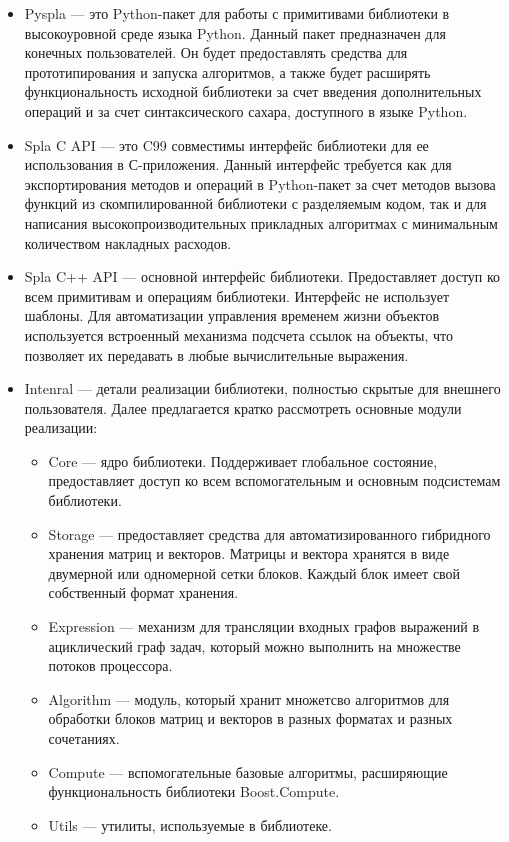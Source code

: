 \begin{itemize}
    \item Pyspla --- это Python-пакет для работы с примитивами библиотеки в высокоуровной среде языка Python. Данный пакет предназначен для конечных пользователей. Он будет предоставлять средства для прототипирования и запуска алгоритмов, а также будет расширять функциональность исходной библиотеки за счет введения дополнительных операций и за счет синтаксического сахара, доступного в языке Python.
    
    \item Spla C API --- это C99 совместимы интерфейс библиотеки для ее использования в С-приложения. Данный интерфейс требуется как для экспортирования методов и операций в Python-пакет за счет методов вызова функций из скомпилированной библиотеки с разделяемым кодом, так и для написания высокопроизводительных прикладных алгоритмах с минимальным количеством накладных расходов.
    
    \item Spla C++ API --- основной интерфейс библиотеки. Предоставляет доступ ко всем примитивам и операциям библиотеки. Интерфейс не использует шаблоны. Для автоматизации управления временем жизни объектов используется встроенный механизма подсчета ссылок на объекты, что позволяет их передавать в любые вычислительные выражения.
    
    \item Intenral --- детали реализации библиотеки, полностью скрытые для внешнего пользователя. Далее предлагается кратко рассмотреть основные модули реализации:
    
    \begin{itemize}
        \item Core --- ядро библиотеки. Поддерживает глобальное состояние, предоставляет доступ ко всем вспомогательным и основным подсистемам библиотеки. 
        \item Storage --- предоставляет средства для автоматизированного гибридного хранения матриц и векторов. Матрицы и вектора хранятся в виде двумерной или одномерной сетки блоков. Каждый блок имеет свой собственный формат хранения.
        \item Expression --- механизм для трансляции входных графов выражений в ациклический граф задач, который можно выполнить на множестве потоков процессора. 
        \item Algorithm --- модуль, который хранит множетсво алгоритмов для обработки блоков матриц и векторов в разных форматах и разных сочетаниях.
        \item Compute --- вспомогательные базовые алгоритмы, расширяющие функциональность библиотеки Boost.Compute.
        \item Utils --- утилиты, используемые в библиотеке.
    \end{itemize}
    

\end{itemize}
